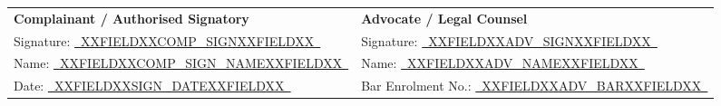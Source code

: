 \documentclass[12pt,a4paper]{article}
\newcommand{\fillline}[1]{\underline{~#1~}}
\begin{document}
\vspace{2em}

\noindent
\begin{tabularx}{\textwidth}{@{}X X@{}}
    \textbf{Complainant / Authorised Signatory} & \textbf{Advocate / Legal Counsel}\\[0.5em]
    Signature: \fillline{XXFIELDXXCOMP_SIGNXXFIELDXX} & Signature: \fillline{XXFIELDXXADV_SIGNXXFIELDXX}\\[0.5em]
    Name: \fillline{XXFIELDXXCOMP_SIGN_NAMEXXFIELDXX} & Name: \fillline{XXFIELDXXADV_NAMEXXFIELDXX}\\[0.5em]
    Date: \fillline{XXFIELDXXSIGN_DATEXXFIELDXX} & Bar Enrolment No.: \fillline{XXFIELDXXADV_BARXXFIELDXX}\\
\end{tabularx}
\end{document}
